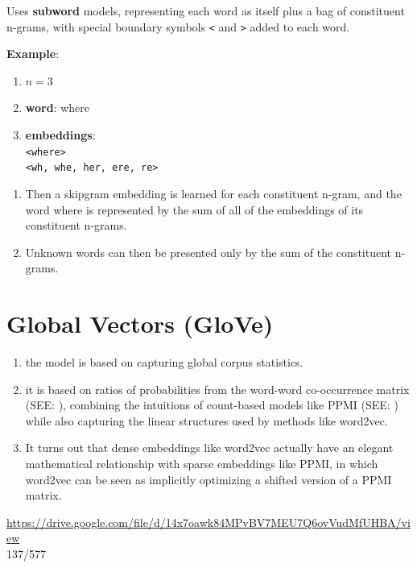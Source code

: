 \vspace{0.2cm}
\noindent Uses \textbf{subword} models, representing each word as itself plus a bag of constituent n-grams, with special boundary symbols \texttt{<} and \texttt{>} added to each word.

\vspace{0.2cm}
\noindent\textbf{Example}:\\
\begin{enumerate}
    \item $n=3$
    \item \textbf{word}: where
    \item \textbf{embeddings}: \\ \texttt{<where>} \\ \texttt{<wh, whe, her, ere, re>}
\end{enumerate}

\begin{enumerate}
    \item Then a skipgram embedding is learned for each constituent n-gram, and the word where is represented by the sum of all of the embeddings of its constituent n-grams.
    
    \item Unknown words can then be presented only by the sum of the constituent n-grams.
\end{enumerate}



\section{Global Vectors (GloVe) \cite{nlp-1}}\label{Global Vectors (GloVe)}

\begin{enumerate}
    \item the model is based on capturing global corpus statistics.

    \item it is based on ratios of probabilities from the word-word co-occurrence matrix (SEE: ), combining the intuitions of count-based models like PPMI (SEE: ) while also capturing the linear structures used by methods like word2vec.

    \item It turns out that dense embeddings like word2vec actually have an elegant mathematical relationship with sparse embeddings like PPMI, in which word2vec can be seen as implicitly optimizing a shifted version of a PPMI matrix.
\end{enumerate}






\vspace{4cm}
\url{https://drive.google.com/file/d/14x7oawk84MPvBV7MEU7Q6ovVudMfUHBA/view}\\
137/577



